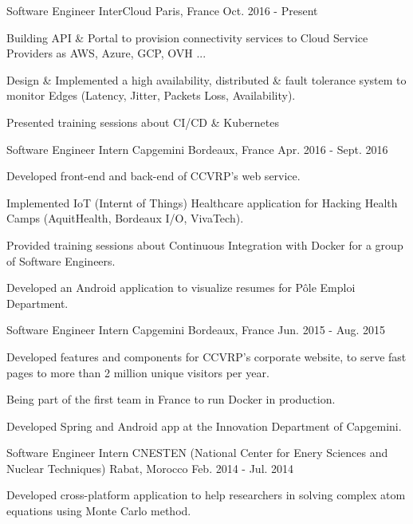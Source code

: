 \begin{cventries}
  \cventry
    {Software Engineer}
    {InterCloud}
    {Paris, France}
    {Oct. 2016 - Present}
    {
      \begin{cvitems}
        \item {Building API \& Portal to provision connectivity services to Cloud Service Providers as AWS, Azure, GCP, OVH ...}
         \item {Design \& Implemented a high availability, distributed \& fault tolerance system to monitor Edges (Latency, Jitter, Packets Loss, Availability).}
         \item {Presented training sessions about CI/CD \& Kubernetes}
      \end{cvitems}
    }
    \cventry
    {Software Engineer Intern}
    {Capgemini}
    {Bordeaux, France}
    {Apr. 2016 - Sept. 2016}
    {
      \begin{cvitems}
        \item {Developed front-end and back-end of CCVRP's web service.}
         \item {Implemented IoT (Internt of Things) Healthcare application for Hacking Health Camps (AquitHealth, Bordeaux I/O, VivaTech).}
         \item {Provided training sessions about Continuous Integration with Docker for a group of Software Engineers.}
         \item {Developed an Android application to visualize resumes for Pôle Emploi Department.}
      \end{cvitems}
    }
    \cventry
    {Software Engineer Intern}
    {Capgemini}
    {Bordeaux, France}
    {Jun. 2015 - Aug. 2015}
    {
      \begin{cvitems}
        \item {Developed features and components for CCVRP's corporate website, to serve fast pages to more than 2 million unique visitors per year.}
         \item {Being part of the first team in France to run Docker in production.}
         \item {Developed Spring and Android app at the Innovation Department of Capgemini.}
      \end{cvitems}
    }
    \cventry
    {Software Engineer Intern}
    {CNESTEN (National Center for Enery Sciences and Nuclear Techniques)}
    {Rabat, Morocco}
    {Feb. 2014 - Jul. 2014}
    {
      \begin{cvitems}
        \item {Developed cross-platform application to help researchers in solving complex atom equations using Monte Carlo method.}
      \end{cvitems}
    }
\end{cventries}
